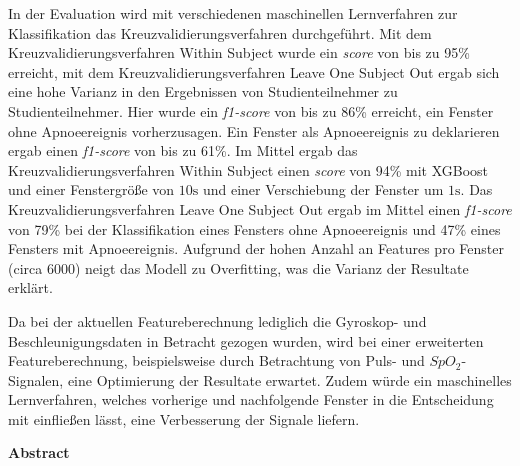 In der Evaluation wird mit verschiedenen maschinellen Lernverfahren zur Klassifikation das Kreuzvalidierungsverfahren durchgeführt.
Mit dem Kreuzvalidierungsverfahren {\glqq Within Subject\grqq} wurde ein \textit{score} von bis zu 95\% erreicht, mit dem Kreuzvalidierungsverfahren {\glqq Leave One Subject Out\grqq} ergab sich eine hohe Varianz in den Ergebnissen von Studienteilnehmer zu Studienteilnehmer.
Hier wurde ein \textit{f1-score} von bis zu 86\% erreicht, ein Fenster ohne Apnoeereignis vorherzusagen. 
Ein Fenster als Apnoeereignis zu deklarieren ergab einen \textit{f1-score} von bis zu 61\%. 
Im Mittel ergab das Kreuzvalidierungsverfahren {\glqq Within Subject\grqq} einen \textit{score} von 94\% mit XGBoost und einer Fenstergröße von $10\si{\s}$ und einer Verschiebung der Fenster um $1\si{\s}$.
Das Kreuzvalidierungsverfahren {\glqq Leave One Subject Out\grqq} ergab im Mittel einen \textit{f1-score} von 79\% bei der Klassifikation eines Fensters ohne Apnoeereignis und 47\% eines Fensters mit Apnoeereignis.
Aufgrund der hohen Anzahl an Features pro Fenster (circa 6000) neigt das Modell zu Overfitting, was die Varianz der Resultate erklärt.

Da bei der aktuellen Featureberechnung lediglich die Gyroskop- und Beschleunigungsdaten in Betracht gezogen wurden, wird bei einer erweiterten Featureberechnung, beispielsweise      durch Betrachtung von Puls- und $SpO_2$-Signalen, eine Optimierung der Resultate erwartet.
Zudem würde ein maschinelles Lernverfahren, welches vorherige und nachfolgende Fenster in die Entscheidung mit einfließen lässt, eine Verbesserung der Signale liefern.



\cleardoublepage
\vspace*{1em}
\begin{center}
	\textbf{Abstract}
\end{center}

